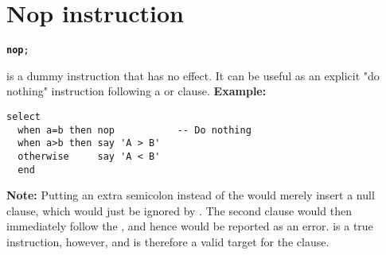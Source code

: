 \chapter{Nop instruction}
\begin{shaded}
\begin{alltt}
\textbf{nop};
\end{alltt}
\end{shaded}
  is a dummy instruction that has no effect.  It can be
useful as an explicit "do nothing" instruction following a
 or  clause.
 \textbf{Example:}
\begin{lstlisting}
select
  when a=b then nop           -- Do nothing
  when a>b then say 'A > B'
  otherwise     say 'A < B'
  end
\end{lstlisting}
\begin{shaded}\noindent
\textbf{Note: }Putting an extra semicolon instead of the  would
merely insert a null clause, which would just be ignored by \nr{}.
The second  clause would then immediately follow the
, and hence would be reported as an error.
 is a true instruction, however, and is therefore a valid
target for the  clause.
\end{shaded}\indent